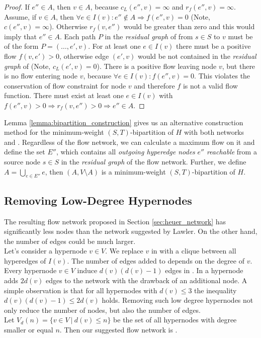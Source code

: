 \begin{proof}
If $e'' \in A$, then $v \in A$, because $c_L(e'',v) = \infty$ and $r_f(e'',v) = \infty$.
Assume, if $v \in A$, then $\forall e \in I(v): e'' \notin A \Rightarrow f(e'',v) = 0$ (Note, $c(e'',v) = \infty$). 
Otherwise $r_f(v, e'')$ would be greater than zero and this would imply that $e'' \in A$. Each path 
$P$ in the \emph{residual graph} of  from $s \in S$ to $v$ must be of the 
form $P = (\ldots,e',v)$. For at least one $e \in I(v)$ there must be a positive flow $f(v,e') > 0$,
otherwise edge $(e',v)$ would be not contained in the \emph{residual graph} of  (Note, $c_L(e',v) = 0$).
There is a positive flow leaving node $v$, but there is no flow entering node $v$, because
$\forall e \in I(v): f(e'',v) = 0$. This violates the conservation of flow
constraint for node $v$ and therefore $f$ is not a valid flow function. There must exist at least one $e \in I(v)$
with $f(e'',v) > 0 \Rightarrow r_f(v,e'') > 0 \Rightarrow e'' \in A$.
\end{proof}

Lemma \ref{lemma:bipartition_construction} gives us an alternative construction method for the minimum-weight $(S,T)$-bipartition
of $H$ with both networks  and . Regardless of the flow network, we can 
calculate a maximum flow on it and define the set $E''$, which contains all \emph{outgoing hyperedge
nodes} $e''$ \emph{reachable} from a source node $s \in S$ in the \emph{residual graph} of the flow network. 
Further, we define $A = \bigcup_{e \in E''} e$, then $(A,V\setminus A)$ is a 
minimum-weight $(S,T)$-bipartition of $H$.


\subsection{Removing Low-Degree Hypernodes}
\label{sec:degree_network}

The resulting flow network  proposed in Section \ref{sec:heuer_network} has significantly
less nodes than the network  suggested by Lawler. On the other hand, the number of
edges could be much larger. \\
Let's consider a hypernode $v \in V$. We replace $v$ in  with a clique between all
hyperedges of $I(v)$. The number of edges added to  depends on the degree of
$v$. Every hypernode $v \in V$ induce $d(v)(d(v) - 1)$ edges in . In  a hypernode adds $2d(v)$ edges to the network with the drawback
of an additional node. A simple observation is that for all hypernodes with $d(v) \le 3$ the inequality
$d(v)(d(v) - 1) \le 2d(v)$ holds. Removing such low degree hypernodes not only reduce
the number of nodes, but also the number of edges. \\
Let $V_{d}(n) = \{v \in V\ |\ d(v) \le n\}$ be the set of all hypernodes
with degree smaller or equal $n$. Then our suggested flow network is .

